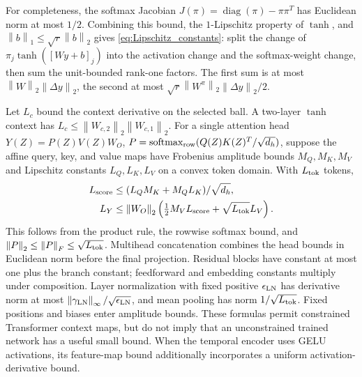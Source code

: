 \documentclass[journal]{IEEEtran}
\theoremstyle{plain}
\theoremstyle{definition}
\newcommand{\norm}[1]{\left\lVert #1\right\rVert}
\begin{document}
For completeness, the softmax Jacobian $J(\pi)=\operatorname{diag}(\pi)-\pi\pi^T$ has Euclidean norm at most $1/2$. Combining this bound, the $1$-Lipschitz property of $\tanh$, and $\norm{b}_1\le\sqrt r\norm{b}_2$ gives \eqref{eq:Lipschitz_constants}: split the change of $\pi_j\tanh([Wy+b]_j)$ into the activation change and the softmax-weight change, then sum the unit-bounded rank-one factors. The first sum is at most $\norm{W}_2\norm{\Delta y}_2$, the second at most $\sqrt r\norm{W^\pi}_2\norm{\Delta y}_2/2$.

Let $L_c$ bound the context derivative on the selected ball. A two-layer $\tanh$ context has $L_c\le\norm{W_{c,2}}_2\norm{W_{c,1}}_2$. For a single attention head $Y(Z)=P(Z)V(Z)W_O$, $P=\operatorname{softmax}_{\rm row}(Q(Z)K(Z)^T/\sqrt{d_h})$, suppose the affine query, key, and value maps have Frobenius amplitude bounds $M_Q,M_K,M_V$ and Lipschitz constants $L_Q,L_K,L_V$ on a convex token domain. With $L_{\rm tok}$ tokens,
\begin{equation}
\begin{split}
L_{\rm score}&\le(L_QM_K+M_QL_K)/\sqrt{d_h},\\
L_Y&\le\norm{W_O}_2\left(\tfrac12M_VL_{\rm score}
+\sqrt{L_{\rm tok}}L_V\right).
\end{split}
\label{eq:attention_bound}
\end{equation}
This follows from the product rule, the rowwise softmax bound, and $\norm{P}_2\le\norm{P}_F\le\sqrt{L_{\rm tok}}$. Multihead concatenation combines the head bounds in Euclidean norm before the final projection. Residual blocks have constant at most one plus the branch constant; feedforward and embedding constants multiply under composition. Layer normalization with fixed positive $\epsilon_{\rm LN}$ has derivative norm at most $\norm{\gamma_{\rm LN}}_\infty/\sqrt{\epsilon_{\rm LN}}$, and mean pooling has norm $1/\sqrt{L_{\rm tok}}$. Fixed positions and biases enter amplitude bounds. These formulas permit constrained Transformer context maps, but do not imply that an unconstrained trained network has a useful small bound. When the temporal encoder uses GELU activations, its feature-map bound additionally incorporates a uniform activation-derivative bound.
\end{document}
